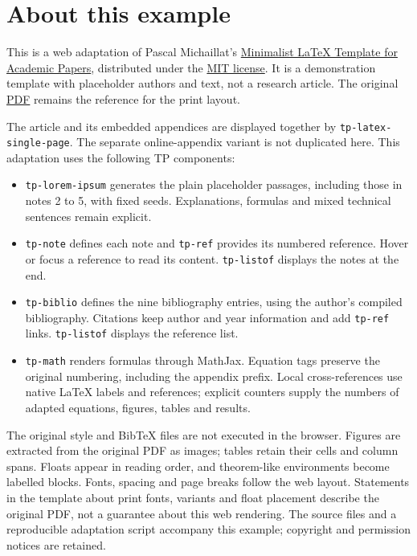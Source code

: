 \section*{About this example}
This is a web adaptation of Pascal Michaillat's \href{https://github.com/pmichaillat/latex-paper}{Minimalist LaTeX Template for Academic Papers}, distributed under the \href{https://github.com/pmichaillat/latex-paper/blob/main/LICENSE.md}{MIT license}. It is a demonstration template with placeholder authors and text, not a research article. The original \href{https://pascalmichaillat.org/a.pdf}{PDF} remains the reference for the print layout.

The article and its embedded appendices are displayed together by \texttt{tp-latex-single-page}. The separate online-appendix variant is not duplicated here. This adaptation uses the following TP components:
\begin{itemize}
\item \texttt{tp-lorem-ipsum} generates the plain placeholder passages, including those in notes 2 to 5, with fixed seeds. Explanations, formulas and mixed technical sentences remain explicit.
\item \texttt{tp-note} defines each note and \texttt{tp-ref} provides its numbered reference. Hover or focus a reference to read its content. \texttt{tp-listof} displays the notes at the end.
\item \texttt{tp-biblio} defines the nine bibliography entries, using the author's compiled bibliography. Citations keep author and year information and add \texttt{tp-ref} links. \texttt{tp-listof} displays the reference list.
\item \texttt{tp-math} renders formulas through MathJax. Equation tags preserve the original numbering, including the appendix prefix. Local cross-references use native LaTeX labels and references; explicit counters supply the numbers of adapted equations, figures, tables and results.
\end{itemize}

The original style and BibTeX files are not executed in the browser. Figures are extracted from the original PDF as images; tables retain their cells and column spans. Floats appear in reading order, and theorem-like environments become labelled blocks. Fonts, spacing and page breaks follow the web layout. Statements in the template about print fonts, variants and float placement describe the original PDF, not a guarantee about this web rendering. The source files and a reproducible adaptation script accompany this example; copyright and permission notices are retained.


